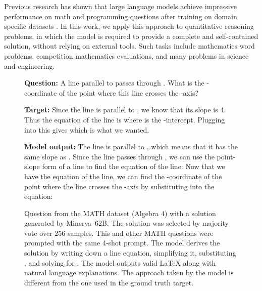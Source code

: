 \documentclass{article}
\newcommand{\ourmodel}[0]{{Minerva~}}
\begin{document}
Previous research has shown that large language models achieve impressive performance on math and programming questions after training on domain specific datasets \citep{codex,austin2021program,ocw_codex}. 
In this work, we apply this approach to quantitative reasoning problems, in which the model is required to provide a complete and self-contained solution, without relying on external tools.
Such tasks include mathematics word problems, competition mathematics evaluations, and many problems in science and engineering.

\begin{figure}
\begin{tcolorbox}[colback=blue!5!white,colframe=blue!75!black]
\begin{small}
\textbf{Question:}
A line parallel to  passes through . What is the -coordinate of the point where this line crosses the -axis?
\vspace{3mm}

\textbf{Target:}
 Since the line is parallel to , we know that its slope is 4.  Thus the equation of the line is  where  is the -intercept.  Plugging  into this gives  which is what we wanted.
\end{small}
\tcblower
\begin{small}
\textbf{Model output:}
 The line is parallel to , which means that it has the same slope as .  Since the line passes through , we can use the point-slope form of a line to find the equation of the line: 
Now that we have the equation of the line, we can find the -coordinate of the point where the line crosses the -axis by substituting  into the equation:

\end{small}
\end{tcolorbox}
\caption{\small
Question from the MATH dataset (Algebra 4) with a solution generated by \ourmodel 62B. The solution was selected by majority vote over 256 samples.
This and other MATH questions were prompted with the same 4-shot prompt. 
The model derives the solution by writing down a line equation, simplifying it, substituting , and solving for . The model outputs valid \LaTeX{} along with natural language explanations. The approach taken by the model is different from the one used in the ground truth target.
}
\label{fig:example_MATH}
\end{figure}
\end{document}
